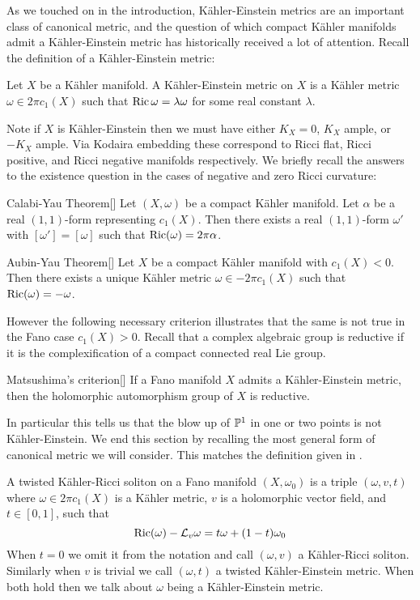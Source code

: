 As we touched on in the introduction, K\"ahler-Einstein metrics are an important class of canonical metric, and the question of which compact K\"ahler manifolds admit a K\"ahler-Einstein metric has historically received a lot of attention. Recall the definition of a K\"ahler-Einstein metric:
\begin{definition}
Let \(X\) be a K\"ahler manifold. A K\"ahler-Einstein metric on \(X\) is a K\"ahler metric \(\omega \in 2 \pi c_1(X)\) such that \(\mathop{\rm Ric}\nolimits \omega = \lambda \omega\) for some real constant \(\lambda\).
\end{definition}
Note if \(X\) is K\"ahler-Einstein then we must have either \(K_X = 0\), \(K_X\) ample, or \(-K_X\) ample. Via Kodaira embedding these correspond to Ricci flat, Ricci positive, and Ricci negative manifolds respectively. We briefly recall the answers to the existence question in the cases of negative and zero Ricci curvature:
\begin{namedthm}{Calabi-Yau Theorem}[{\cite[Theorem 1]{yau1977calabi}}]
Let \((X,\omega)\) be a compact K\"ahler manifold. Let \(\alpha\) be a real \((1,1)\)-form representing \(c_1(X)\). Then there exists a real \((1,1)\)-form \(\omega'\) with \([\omega'] = [\omega]\) such that \(\mathop{\rm Ric}\nolimits(\omega) = 2 \pi \alpha \).
\end{namedthm}
\begin{namedthm}{Aubin-Yau Theorem}[{\cite{yau1975,Aubin1976}}]
Let \(X\) be a compact K\"ahler manifold with \(c_1(X) < 0 \). Then there exists a unique K\"ahler metric \(\omega \in -2 \pi c_1(X)\) such that \(\mathop{\rm Ric}\nolimits(\omega) = -\omega\).
\end{namedthm}
However the following necessary criterion illustrates that the same is not true in the Fano case \(c_1(X)> 0\). Recall that a complex algebraic group is reductive if it is the complexification of a compact connected real Lie group.
\begin{namedthm}{Matsushima's criterion}[\cite{matsushima1957structure}]
If a Fano manifold \(X\) admits a K\"ahler-Einstein metric, then the holomorphic automorphism group of \(X\) is reductive.\end{namedthm}
In particular this tells us that the blow up of \(\mathbb{P}^1\) in one or two points is not K\"ahler-Einstein. We end this section by recalling the most general form of canonical metric we will consider. This matches the definition given in \cite[Definiton 3]{datar2016kahler}.
\begin{definition} \label{def:tKRS}
A twisted K\"ahler-Ricci soliton on a Fano manifold \((X,\omega_0)\) is a triple \((\omega,v, t)\) where \(\omega \in 2 \pi c_1(X)\) is a K\"ahler metric, \(v\) is a holomorphic vector field, and \(t \in [0,1]\), such that
\[
\mathop{\rm Ric}\nolimits(\omega) - \mathcal{L}_v \omega = t \omega + (1-t) \omega_0
\]
When \(t = 0\) we omit it from the notation and call \((\omega,v)\) a K\"ahler-Ricci soliton. Similarly when \(v\) is trivial we call \((\omega,t)\) a twisted K\"ahler-Einstein metric. When both hold then we talk about \(\omega\) being a K\"ahler-Einstein metric.
\end{definition}

